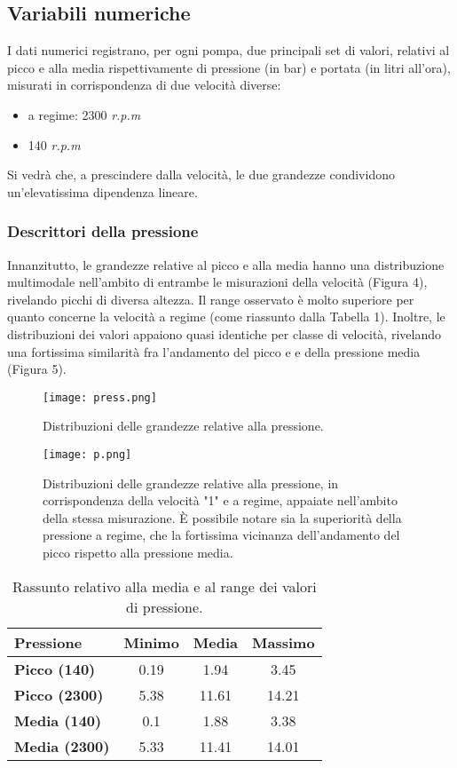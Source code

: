 \documentclass[fleqn,10pt]{SelfArx} %
\begin{document}
\subsection{Variabili numeriche}
I dati numerici registrano, per ogni pompa, due principali set di valori, relativi al picco e alla media rispettivamente di pressione (in bar) e portata (in litri all'ora), misurati in corrispondenza di due velocità diverse:
\begin{itemize}
    \item a regime: 2300 \textit{r.p.m}
    \item 140 \textit{r.p.m}
\end{itemize}
Si vedrà che, a prescindere dalla velocità, le due grandezze condividono un'elevatissima dipendenza lineare.
\subsubsection{Descrittori della pressione}
Innanzitutto, le grandezze relative al picco e alla media hanno una distribuzione multimodale nell'ambito di entrambe le misurazioni della velocità (Figura 4), rivelando picchi di diversa altezza. Il range osservato è molto superiore per quanto concerne la velocità a regime (come riassunto dalla Tabella 1). Inoltre, le distribuzioni dei valori appaiono quasi identiche per classe di velocità, rivelando una fortissima similarità fra l'andamento del picco e e della pressione media (Figura 5).
\begin{figure}[h]
    \centering
    \texttt{[image: press.png]}
    \label{fig:em}
    \caption{Distribuzioni delle grandezze relative alla pressione.}
\end{figure}
\begin{figure}[h]
    \centering
    \texttt{[image: p.png]}
    \label{fig:em}
    \caption{Distribuzioni delle grandezze relative alla pressione, in corrispondenza della velocità "1" e a regime, appaiate nell'ambito della stessa misurazione. È possibile notare sia la superiorità della pressione a regime, che la fortissima vicinanza dell'andamento del picco rispetto alla pressione media.}
\end{figure}
{\begin{table}[h]
\centering
\begin{tabular}[t]{lccc}
\toprule
Pressione&Minimo&Media&Massimo\\
\midrule
\textbf{Picco (140)}&0.19&1.94&3.45\\
\textbf{Picco (2300)}&5.38&11.61&14.21\\
\textbf{Media (140)}&0.1&1.88&3.38\\
\textbf{Media (2300)}&5.33&11.41&14.01\\
\bottomrule
\end{tabular}
\caption{Rassunto relativo alla media e al range dei valori di pressione.}
\end{table}}
\end{document}
